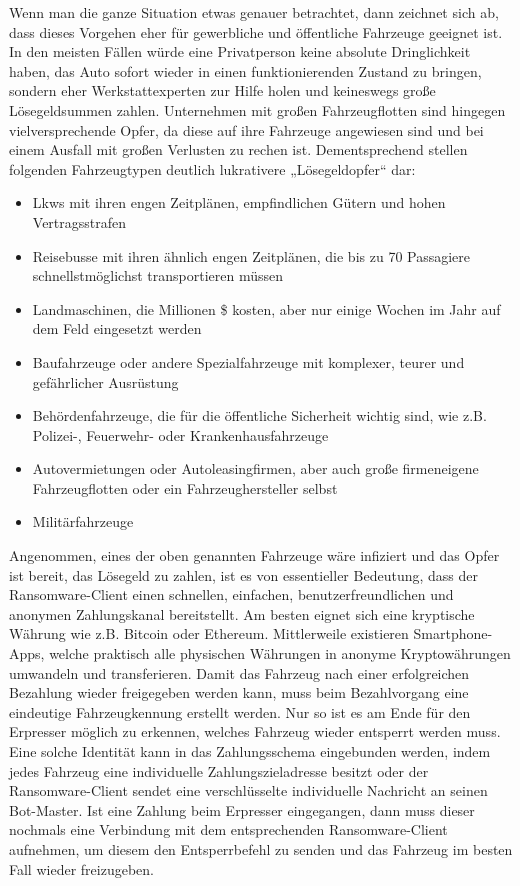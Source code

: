 Wenn man die ganze Situation etwas genauer betrachtet, dann zeichnet sich ab, dass dieses 
Vorgehen eher für gewerbliche und öffentliche Fahrzeuge geeignet ist. In den meisten Fällen 
würde eine Privatperson keine absolute Dringlichkeit haben, das Auto sofort wieder in einen 
funktionierenden Zustand zu bringen, sondern eher Werkstattexperten zur Hilfe holen und 
keineswegs große Lösegeldsummen zahlen. 
\newline
Unternehmen mit großen Fahrzeugflotten sind hingegen vielversprechende Opfer, da diese auf 
ihre Fahrzeuge angewiesen sind und bei einem Ausfall mit großen Verlusten zu rechen ist. 
Dementsprechend stellen folgenden Fahrzeugtypen deutlich lukrativere „Lösegeldopfer“ dar:

\begin{itemize}
    \item Lkw\textquotesingle s mit ihren engen Zeitplänen, empfindlichen Gütern und hohen Vertragsstrafen
    \item Reisebusse mit ihren ähnlich engen Zeitplänen, die bis zu 70 Passagiere schnellstmöglichst transportieren müssen
    \item Landmaschinen, die Millionen \$ kosten, aber nur einige Wochen im Jahr auf dem Feld eingesetzt werden
    \item Baufahrzeuge oder andere Spezialfahrzeuge mit komplexer, teurer und gefährlicher Ausrüstung
    \item Behördenfahrzeuge, die für die öffentliche Sicherheit wichtig sind, wie z.B. Polizei-, Feuerwehr- oder Krankenhausfahrzeuge
    \item Autovermietungen oder Autoleasingfirmen, aber auch große firmeneigene Fahrzeugflotten oder ein Fahrzeughersteller selbst
    \item Militärfahrzeuge
\end{itemize}

Angenommen, eines der oben genannten Fahrzeuge wäre infiziert und das Opfer ist bereit, 
das Lösegeld zu zahlen, ist es von essentieller Bedeutung, dass der Ransomware-Client einen 
schnellen, einfachen, benutzerfreundlichen und anonymen Zahlungskanal bereitstellt. Am besten 
eignet sich eine kryptische Währung wie z.B. Bitcoin oder Ethereum. Mittlerweile existieren 
Smartphone-Apps, welche praktisch alle physischen Währungen in anonyme Kryptowährungen 
umwandeln und transferieren.
\newline
Damit das Fahrzeug nach einer erfolgreichen Bezahlung wieder freigegeben werden kann, muss 
beim Bezahlvorgang eine eindeutige Fahrzeugkennung erstellt werden. Nur so ist es am Ende 
für den Erpresser möglich zu erkennen, welches Fahrzeug wieder entsperrt werden muss. Eine 
solche Identität kann in das Zahlungsschema eingebunden werden, indem jedes Fahrzeug eine 
individuelle Zahlungszieladresse besitzt oder der Ransomware-Client sendet eine verschlüsselte 
individuelle Nachricht an seinen Bot-Master.
\newline
Ist eine Zahlung beim Erpresser eingegangen, dann muss dieser nochmals eine Verbindung mit 
dem entsprechenden Ransomware-Client aufnehmen, um diesem den Entsperrbefehl zu senden und 
das Fahrzeug im besten Fall wieder freizugeben.  
